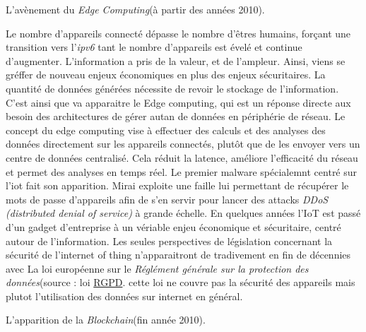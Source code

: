 \vspace{0.1cm}

L'avènement du \textit{Edge Computing}(à partir des années 2010).

Le nombre d'appareils connecté  dépasse le nombre d'êtres humains, forçant une transition vers l'\textit{ipv6} tant le nombre d'appareils est évelé et continue d'augmenter. L'information a pris de la valeur, et de l'ampleur. Ainsi, viens se gréffer de nouveau enjeux économiques en plus des enjeux sécuritaires. La quantité de données générées nécessite de revoir le stockage de l'information. C'est ainsi que va apparaitre le Edge computing\cite{edge}, qui est un réponse directe aux besoin des architectures de gérer autan de données en périphérie de réseau. Le concept du edge computing vise à effectuer des calculs et des analyses des données directement sur les appareils connectés, plutôt que de les envoyer vers un centre de données centralisé. Cela réduit la latence, améliore l'efficacité du réseau et permet des analyses en temps réel. Le premier malware spécialemnt centré sur l'iot fait son apparition. Mirai\cite{Mirai} exploite une faille lui permettant de récupérer le mots de passe d'appareils afin de s'en servir pour lancer des attacks \textit{DDoS (distributed denial of service)} à grande échelle. En quelques années l'IoT est passé d'un gadget d'entreprise à un vériable enjeu économique et sécuritaire, centré autour de l'information. Les seules perspectives de législation concernant la sécurité de l'internet of thing n'apparaitront de tradivement en fin de décennies avec La loi européenne sur le \textit{Réglément générale sur la protection des données}(source : loi \href{https://commission.europa.eu/law/law-topic/data-protection/data-protection-eu_en}{RGPD}. cette loi ne couvre pas la sécurité des appareils mais plutot l'utilisation des données sur internet en général.

\vspace{0.1cm}

L'apparition de la \textit{Blockchain}(fin année 2010).

